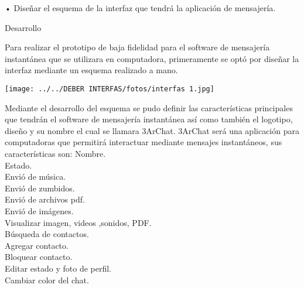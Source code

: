 \documentclass[11pt,a4paper]{report}
\begin{document}
•	Diseñar el esquema de la interfaz que tendrá la aplicación de mensajería.\newpage
 

Desarrollo\vspace{0,5cm}

Para realizar el prototipo de baja fidelidad para el software de mensajería instantánea\vspace{0,5cm}  que se utilizara en computadora, primeramente se optó por diseñar la interfaz mediante\vspace{0,5cm} un esquema realizado a mano.\vspace{0,5cm}

\texttt{[image: ../../DEBER INTERFAS/fotos/interfas 1.jpg]}\newpage

Mediante el desarrollo del esquema se pudo definir las características principales que\vspace{0,5cm} tendrán el software de mensajería instantánea así como también el logotipo, diseño  y su\vspace{0,5cm} nombre el cual se llamara 3ArChat. 
3ArChat  será una aplicación para computadoras que\vspace{0,5cm} permitirá interactuar mediante mensajes instantáneos, sus características son:\vspace{0,5cm} 
Nombre.\newline\\
Estado.\newline\\ 
Envió de música.\newline\\ 
Envió de zumbidos.\newline\\
Envió de archivos pdf.\newline\\ 
Envió de imágenes.\newline\\ 
Visualizar imagen, videos ,sonidos, PDF.\newline\\ 
Búsqueda de contactos.\newline\\
Agregar contacto.\newline\\ 
Bloquear contacto.\newline\\ 
Editar estado y foto de perfil.\newline\\
Cambiar color del chat.\newline\\ 
\end{document}
